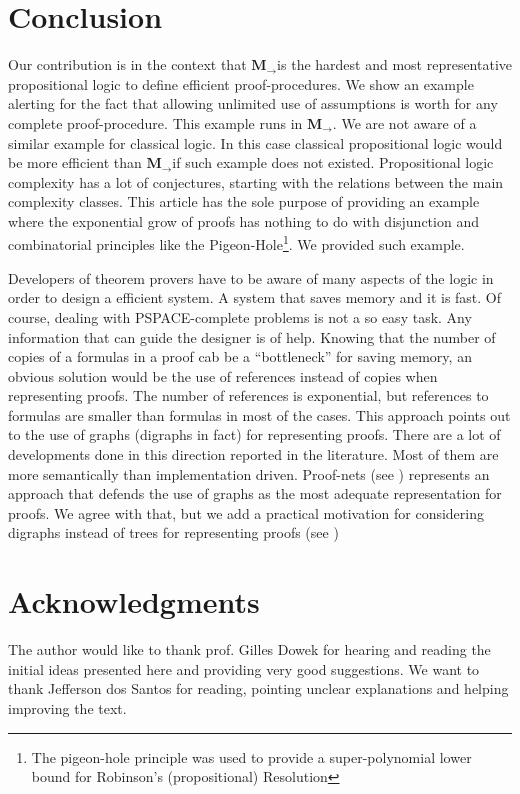 \documentclass[11pt]{llncs}
\newcommand{\mil}{\ensuremath{\mathbf{M}_{\rightarrow}}}
\begin{document}
\section{Conclusion}

Our contribution is in the context that \mil is the hardest and most representative propositional logic to define efficient proof-procedures. We show an example alerting for the fact that allowing unlimited use of assumptions is worth for any complete proof-procedure. This example runs in \mil. We are not aware of a similar example for classical logic. In this case classical propositional logic would be more efficient than \mil if such example does not existed. Propositional logic complexity has a lot of conjectures, starting with the relations between the main complexity classes. This article has the sole purpose of providing an example where the exponential grow of proofs has nothing to do with disjunction and combinatorial principles like the Pigeon-Hole\footnote{The pigeon-hole principle was used to provide a super-polynomial lower bound for Robinson's (propositional) Resolution}. We provided such example. 

Developers of theorem provers have to be aware of many aspects of the logic in order to design a efficient system. A system that saves memory and it is fast. Of course, dealing with PSPACE-complete problems is not a so easy task. Any information that can guide the designer is of help. Knowing that the number of copies of a formulas in a proof cab be a ``bottleneck''  for saving memory, an obvious solution would be the use of references instead of copies when representing proofs. The number of references is exponential, but references to formulas are smaller than formulas in most of the cases. This approach points out to the use of graphs (digraphs in fact) for representing proofs. There are a lot of developments done in this direction reported in the literature. Most of them are more semantically than implementation driven. Proof-nets (see \cite{Girard}) represents an approach that defends the use of graphs as the most adequate representation for proofs. We agree with that, but we add a practical motivation for considering digraphs instead of trees for representing proofs (see \cite{EPTCS}) 

\section{Acknowledgments} 

The author would like to thank prof. Gilles Dowek for hearing and reading the initial ideas presented here and providing very good suggestions. We want to thank Jefferson dos Santos for reading, pointing unclear explanations and helping improving the text. 



\end{document}
